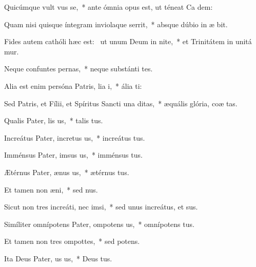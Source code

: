 \item Quicúmque vult vus se,~* ante ómnia opus est, ut téneat Ca dem:
\item Quam nisi quisque íntegram inviolaque serrit,~* absque dúbio in æ bit.
\item Fides autem cathóli hæc est:~\pscross{} ut unum Deum in nite,~* et Trinitátem in unitá mur.
\item Neque confuntes pernas,~* neque substánti tes.
\item Alia est enim persóna Patris, lia i,~* ália  ti:
\item Sed Patris, et Fílii, et Spíritus Sancti una  ditas,~* æquális glória, coæ tas.
\item Qualis Pater, lis us,~* talis  tus.
\item Increátus Pater, incretus us,~* increátus  tus.
\item Imménsus Pater, imsus us,~* imménsus  tus.
\item Ætérnus Pater, ænus us,~* ætérnus  tus.
\item Et tamen non  æni,~* sed  nus.
\item Sicut non tres increáti, nec  imsi,~* sed unus increátus, et  sus.
\item Simíliter omnípotens Pater, ompotens us,~* omnípotens  tus.
\item Et tamen non tres ompottes,~* sed  potens.
\item Ita Deus Pater, us us,~* Deus  tus.
